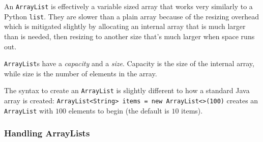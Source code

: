 An \texttt{ArrayList} is effectively a variable sized array that works very similarly to a Python \texttt{list}.
They are slower than a plain array because of the resizing overhead which is mitigated slightly by allocating an internal array that is much larger than is needed, then resizing to another size that's much larger when space runs out.

\texttt{ArrayList}s have a \emph{capacity} and a \emph{size}.
Capacity is the size of the internal array, while size is the number of elements in the array.

The syntax to create an \texttt{ArrayList} is slightly different to how a standard Java array is created: \texttt{ArrayList<String> items = new ArrayList<>(100)} creates an \texttt{ArrayList} with \(100\) elements to begin (the default is \(10\) items).

\subsubsection{Handling ArrayLists}\label{ssub:handling_arraylists}

